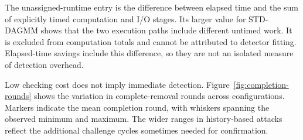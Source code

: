 \documentclass[journal]{IEEEtran}
\begin{document}
The unassigned-runtime entry is the difference between elapsed time and
the sum of explicitly timed computation and I/O stages. Its larger value
for STD-DAGMM shows that the two execution paths include different
untimed work. It is excluded from computation totals and cannot be
attributed to detector fitting. Elapsed-time savings include this
difference, so they are not an isolated measure of detection overhead.

Low checking cost does not imply immediate detection.
Figure~\ref{fig:completion-rounds} shows the variation in complete-removal
rounds across configurations. Markers indicate the mean completion round,
with whiskers spanning the observed minimum and maximum.
The wider ranges in history-based attacks
reflect the additional challenge cycles sometimes needed for confirmation.
\end{document}
